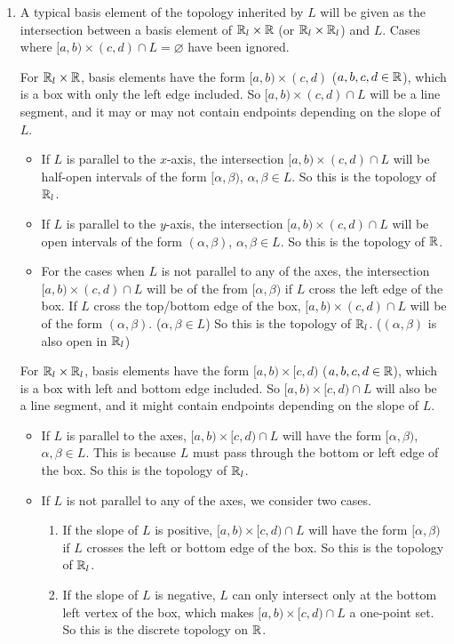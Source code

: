 \documentclass[12pt]{report}
\newcommand{\prob}[1]{\item[\large\textbf{\sffamily #1.}]}
\begin{document}
\begin{enumerate}
    \prob{4} A typical basis element of the topology inherited by \(L\) will be given as the intersection between a basis element of \(\mathbb{R}_l \times \mathbb{R}\) (or \(\mathbb{R}_l \times \mathbb{R}_l\)) and \(L\). Cases where \([a, b) \times (c, d) \cap L = \varnothing\) have been ignored.

    \bigskip

    For \(\mathbb{R}_l \times \mathbb{R}\), basis elements have the form \([a, b) \times (c, d)\) (\(a, b, c, d \in \mathbb{R}\)), which is a box with only the left edge included. So \([a, b) \times (c, d) \cap L\) will be a line segment, and it may or may not contain endpoints depending on the slope of \(L\).
    \begin{itemize}
        \item If \(L\) is parallel to the \(x\)-axis, the intersection \([a, b) \times (c, d) \cap L\) will be half-open intervals of the form \([\alpha, \beta)\), \(\alpha, \beta \in L\). So this is the topology of \(\mathbb{R}_l\).
        \item If \(L\) is parallel to the \(y\)-axis, the intersection \([a, b) \times (c, d) \cap L\) will be open intervals of the form \((\alpha, \beta)\), \(\alpha, \beta \in L\). So this is the topology of \(\mathbb{R}\).
        \item For the cases when \(L\) is not parallel to any of the axes, the intersection \([a, b) \times (c, d) \cap L\) will be of the from \([\alpha, \beta)\) if \(L\) cross the left edge of the box. If \(L\) cross the top/bottom edge of the box, \([a, b) \times (c, d) \cap L\) will be of the form \((\alpha, \beta)\). (\(\alpha, \beta \in L\)) So this is the topology of \(\mathbb{R}_l\). (\((\alpha, \beta)\) is also open in \(\mathbb{R}_l\))
    \end{itemize}

    For \(\mathbb{R}_l \times \mathbb{R}_l\), basis elements have the form \([a, b) \times [c, d)\) (\(a, b, c, d \in \mathbb{R}\)), which is a box with left and bottom edge included. So \([a, b) \times [c, d) \cap L\) will also be a line segment, and it might contain endpoints depending on the slope of \(L\).
    \begin{itemize}
        \item If \(L\) is parallel to the axes, \([a, b) \times [c, d) \cap L\) will have the form \([\alpha, \beta)\), \(\alpha, \beta \in L\). This is because \(L\) must pass through the bottom or left edge of the box. So this is the topology of \(\mathbb{R}_l\).
        \item If \(L\) is not parallel to any of the axes, we consider two cases.
              \begin{enumerate}
                  \item If the slope of \(L\) is positive, \([a, b) \times [c, d) \cap L\) will have the form \([\alpha, \beta)\) if \(L\) crosses the left or bottom edge of the box. So this is the topology of \(\mathbb{R}_l\).
                  \item If the slope of \(L\) is negative, \(L\) can only intersect only at the bottom left vertex of the box, which makes \([a, b) \times [c, d) \cap L\) a one-point set. So this is the discrete topology on \(\mathbb{R}\).
              \end{enumerate}
    \end{itemize}


\end{enumerate}
\end{document}
